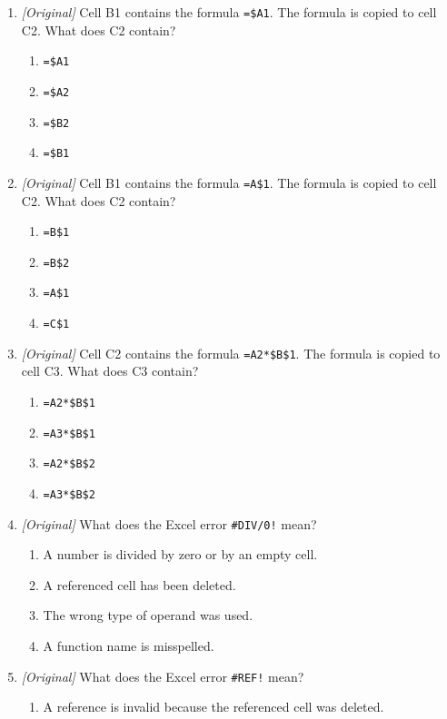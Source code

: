 \begin{enumerate}[label=\textbf{Q\arabic*.}, leftmargin=*]
\item \textit{[Original]} Cell B1 contains the formula \texttt{=\$A1}. The
  formula is copied to cell C2. What does C2 contain?
  \begin{enumerate}[label=\Alph*.]
    \item \texttt{=\$A1}
    \item \texttt{=\$A2}
    \item \texttt{=\$B2}
    \item \texttt{=\$B1}
  \end{enumerate}
\item \textit{[Original]} Cell B1 contains the formula \texttt{=A\$1}. The
  formula is copied to cell C2. What does C2 contain?
  \begin{enumerate}[label=\Alph*.]
    \item \texttt{=B\$1}
    \item \texttt{=B\$2}
    \item \texttt{=A\$1}
    \item \texttt{=C\$1}
  \end{enumerate}
\item \textit{[Original]} Cell C2 contains the formula \texttt{=A2*\$B\$1}.
  The formula is copied to cell C3. What does C3 contain?
  \begin{enumerate}[label=\Alph*.]
    \item \texttt{=A2*\$B\$1}
    \item \texttt{=A3*\$B\$1}
    \item \texttt{=A2*\$B\$2}
    \item \texttt{=A3*\$B\$2}
  \end{enumerate}
\item \textit{[Original]} What does the Excel error \texttt{\#DIV/0!} mean?
  \begin{enumerate}[label=\Alph*.]
    \item A number is divided by zero or by an empty cell.
    \item A referenced cell has been deleted.
    \item The wrong type of operand was used.
    \item A function name is misspelled.
  \end{enumerate}
\item \textit{[Original]} What does the Excel error \texttt{\#REF!} mean?
  \begin{enumerate}[label=\Alph*.]
    \item A reference is invalid because the referenced cell was deleted.

\end{enumerate}
\end{enumerate}
